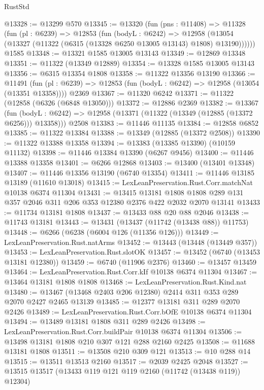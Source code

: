 \begin{lexlean}{RustStd}
\begin{coremodule}
@13328 := @13299 @570
@13345 := @13320
    (fun (pns : @11408) =>
    @11328
      (fun (pl : @6239) =>
      @12853
        (fun (bodyL : @6242) =>
        @12958 (@13054 (@13327 (@11322 (@6315 (@13328 @6250 @13005 @13143) @1808) @13190))))))
    @1585
@13348 := @13321 @1585 @13005 @13143
@13349 := @12869 @13348
@13351 := @11322 (@13349 @12889)
@13354 := @13328 @1585 @13005 @13143
@13356 := @6315 @13354 @1808
@13358 := @11322 @13356 @13190
@13366 := @11491
    (fun (pl : @6239) => @12853 (fun (bodyL : @6242) => @12958 (@13054 (@13351 @13358))))
    @2369
@13367 := @11320 @6242
@13371 := @11322 (@12858 (@6326 (@6848 @13050)))
@13372 := @12886 @2369
@13382 := @13367
    (fun (bodyL : @6242) => @12958 (@13371 (@11322 (@13349 (@12885 (@13372 @6256))) @13358)))
    @2508
@13383 := @11446 @11135
@13384 := @12858 @6852
@13385 := @11322 @13384
@13388 := @13349 (@12885 (@13372 @2508))
@13390 := @11322 @13388 @13358
@13394 := @13383 (@13385 @13390) (@10159 @11132)
@13398 := @11446 @13384 @13390 (@6267 @9456)
@13400 := @11446 @13388 @13358
@13401 := @6266 @12868
@13403 := @13400 (@13401 @13348)
@13407 := @11446 @13356 @13190 (@6740 @13354)
@13411 := @11446 @13185 @13189 (@11610 @13018)
@13415 := LexLeanPreservation.Rust.Corr.matchNat @10138 @6374 @11304
@13431 := @13415
    @13181
    @1808
    @1808
    @289
    @131
    @357
    @2046
    @311
    @206
    @353
    @12380
    @2376
    @422
    @2032
    @2070
    @13141
@13433 := @11734 @13181 @1808
@13437 := @13433 @88 @20 @88 @2046
@13438 := @11743 @13181
@13443 := @13431 (@13437 (@11742 (@13438 @88)) @11753)
@13448 := @6266 (@6238 (@6004 @126 (@11356 @126)))
@13449 := LexLeanPreservation.Rust.natArms
@13452 := @13443 (@13448 (@13449 @357))
@13453 := LexLeanPreservation.Rust.slotOK
@13457 := @13452 (@6740 (@13453 @13181 @12380))
@13459 := @6740 (@11906 @2376)
@13460 := @13457 @13459
@13464 := LexLeanPreservation.Rust.Corr.kIf @10138 @6374 @11304
@13467 := @13464 @13181 @1808 @1808
@13468 := LexLeanPreservation.Rust.Kind.nat
@13480 := @13467 (@13468 @2403 @206 @12380) @2414 @311 @353 @289 @2070 @2427 @2465 @13139
@13485 := @12377 @13181 @311 @289 @2070 @2426
@13489 := LexLeanPreservation.Rust.Corr.bOfE @10138 @6374 @11304
@13494 := @13489 @13181 @1808 @311 @289 @2426
@13498 := LexLeanPreservation.Rust.Corr.buildPair @10138 @6374 @11304
@13506 := @13498 @13181 @1808 @210 @307 @121 @288 @2160 @2425
@13508 := @11688 @13181 @1808
@13511 := @13508 @210 @309 @121
@13513 := @10 @288 @14
@13515 := @13511 @13513 @2160
@13517 := @2039 @2425 @2048
@13527 := @13515 @13517 (@13433 @119 @121 @119 @2160 (@11742 (@13438 @119)) @12304)

\end{coremodule}
\end{lexlean}
